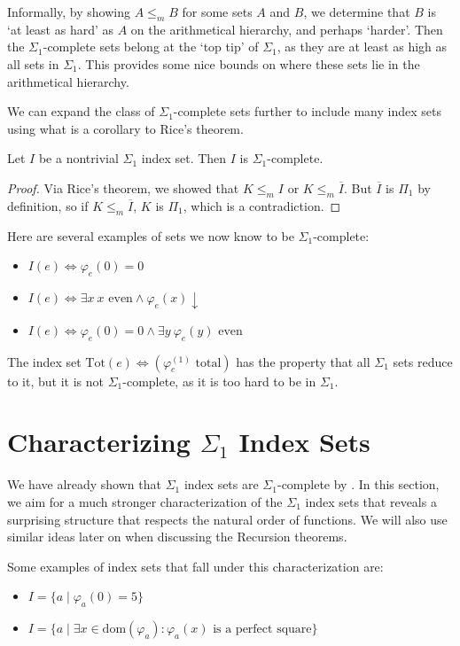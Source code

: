 Informally, by showing $A \leq_m B$ for some sets $A$ and $B$, we determine that $B$ is `at least as hard' as $A$ on the arithmetical hierarchy, and perhaps `harder'. Then the $\Sigma_1$-complete sets belong at the `top tip' of $\Sigma_1$, as they are at least as high as all sets in $\Sigma_1$. This provides some nice bounds on where these sets lie in the arithmetical hierarchy.

We can expand the class of $\Sigma_1$-complete sets further to include many index sets using what is a corollary to Rice's theorem.

\begin{proposition}\label{index-set-complete}
Let $I$ be a nontrivial $\Sigma_1$ index set. Then $I$ is $\Sigma_1$-complete.
\end{proposition}
\begin{proof}
Via Rice's theorem, we showed that $K \leq_m I$ or $K \leq_m \overline{I}$. But $\overline{I}$ is $\Pi_1$ by definition, so if $K \leq_m \overline{I}$, $K$ is $\Pi_1$, which is a contradiction.
\end{proof}

Here are several examples of sets we now know to be $\Sigma_1$-complete:
\begin{itemize}
    \item $I(e) \iff \varphi_e(0) = 0$
    \item $I(e) \iff \exists x \ x \text{ even} \land \varphi_e(x) \downarrow$
    \item $I(e) \iff \varphi_e(0) = 0 \land \exists y \ \varphi_e(y) \text{ even}$
\end{itemize}

The index set $\text{Tot}(e) \iff \left(\varphi_e^{(1)} \text{ total}\right)$ has the property that all $\Sigma_1$ sets reduce to it, but it is not $\Sigma_1$-complete, as it is too hard to be in $\Sigma_1$. 

\section{Characterizing $\Sigma_1$ Index Sets}
We have already shown that $\Sigma_1$ index sets are $\Sigma_1$-complete by . In this section, we aim for a much stronger characterization of the $\Sigma_1$ index sets that reveals a surprising structure that respects the natural order of functions. We will also use similar ideas later on when discussing the Recursion theorems.

Some examples of index sets that fall under this characterization are:
\begin{itemize}
    \item $I = \{ a \mid \varphi_a(0) = 5 \}$
    \item $I = \{ a \mid \exists x \in \text{dom}(\varphi_a) \colon \varphi_a(x) \text{ is a perfect square} \}$
\end{itemize}

